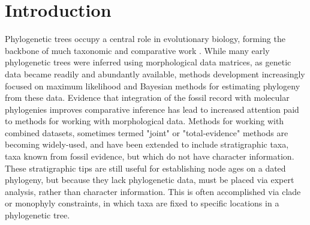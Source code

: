 \documentclass[11pt]{article}
\begin{document}
\section{Introduction}

Phylogenetic trees occupy a central role in evolutionary biology, forming the backbone of much taxonomic \citep{Sneath1973} and comparative work \citep{felsenstein1985a}. 
While many early phylogenetic trees were inferred using morphological data matrices, as genetic data became readily and abundantly available, methods development increasingly focused on maximum likelihood and Bayesian methods for estimating phylogeny from these data.
Evidence that integration of the fossil record with molecular phylogenies improves comparative inference has lead to increased attention paid to methods for working with morphological data.
Methods for working with combined datasets, sometimes termed "joint" \citep{Gavryushkina2016} or "total-evidence" methods are becoming widely-used, and have been extended to include stratigraphic taxa, taxa known from fossil evidence, but which do not have character information.
These stratigraphic tips are still useful for establishing node ages on a dated phylogeny, but because they lack phylogenetic data, must be placed via expert analysis, rather than character information. 
This is often accomplished via clade or monophyly constraints, in which taxa are fixed to specific locations in a phylogenetic tree. \par
\end{document}
